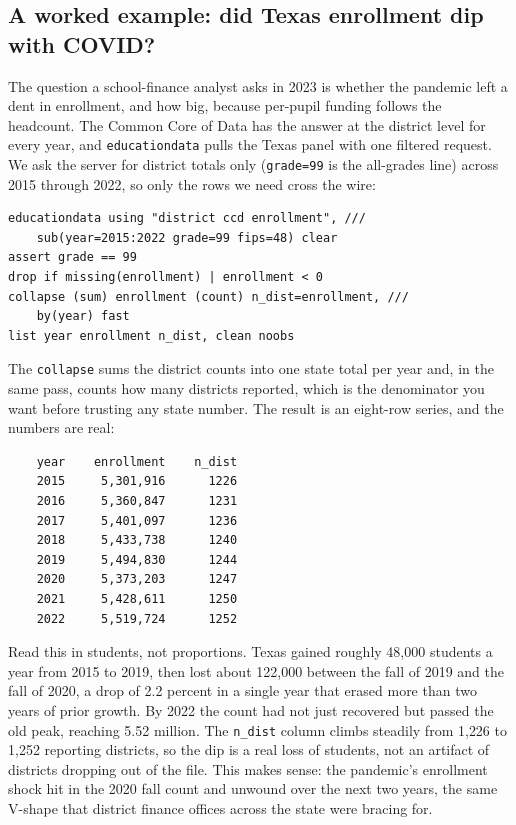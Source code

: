 \documentclass[
    a4paper,
    fontsize=10pt,
    twoside=true,
    numbers=noenddot,
]{kaobook}
\begin{document}
\subsection{A worked example: did Texas enrollment dip with COVID?}\label{sec:ccd}
The question a school-finance analyst asks in 2023 is whether the pandemic left a dent in enrollment, and how big, because per-pupil funding follows the headcount. The Common Core of Data has the answer at the district level for every year, and \texttt{educationdata} pulls the Texas panel with one filtered request. We ask the server for district totals only (\texttt{grade=99} is the all-grades line) across 2015 through 2022, so only the rows we need cross the wire:
{\footnotesize
\begin{verbatim}
educationdata using "district ccd enrollment", ///
    sub(year=2015:2022 grade=99 fips=48) clear
assert grade == 99
drop if missing(enrollment) | enrollment < 0
collapse (sum) enrollment (count) n_dist=enrollment, ///
    by(year) fast
list year enrollment n_dist, clean noobs
\end{verbatim}
}
The \texttt{collapse} sums the district counts into one state total per year and, in the same pass, counts how many districts reported, which is the denominator you want before trusting any state number. The result is an eight-row series, and the numbers are real:
{\footnotesize
\begin{verbatim}
    year    enrollment    n_dist
    2015     5,301,916      1226
    2016     5,360,847      1231
    2017     5,401,097      1236
    2018     5,433,738      1240
    2019     5,494,830      1244
    2020     5,373,203      1247
    2021     5,428,611      1250
    2022     5,519,724      1252
\end{verbatim}
}
Read this in students, not proportions. Texas gained roughly 48{,}000 students a year from 2015 to 2019, then lost about 122{,}000 between the fall of 2019 and the fall of 2020, a drop of 2.2 percent in a single year that erased more than two years of prior growth. By 2022 the count had not just recovered but passed the old peak, reaching 5.52 million. The \texttt{n\_dist} column climbs steadily from 1{,}226 to 1{,}252 reporting districts, so the dip is a real loss of students, not an artifact of districts dropping out of the file. This makes sense: the pandemic's enrollment shock hit in the 2020 fall count and unwound over the next two years, the same V-shape that district finance offices across the state were bracing for.
\end{document}
